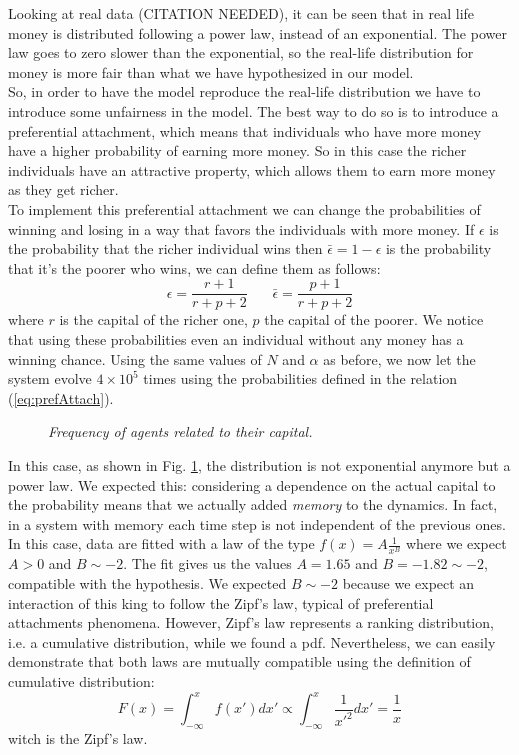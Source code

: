 Looking at real data (CITATION NEEDED), it can be seen that in real life money is distributed following a power law, instead of an exponential.
The power law goes to zero slower than the exponential, so the real-life distribution for money is more fair than what we have hypothesized in our model. \\
So, in order to have the model reproduce the real-life distribution we have to introduce some unfairness in the model.
The best way to do so is to introduce a preferential attachment, which means that individuals who have more money have a higher probability of earning more money.
So in this case the richer individuals have an attractive property, which allows them to earn more money as they get richer. \\
To implement this preferential attachment we can change the probabilities of winning and losing in a way that favors the individuals with more money.
If $\epsilon$ is the probability that the richer individual wins then $\bar{\epsilon} = 1 - \epsilon$ is the probability that it's the poorer who wins, we can define them as follows:
\begin{equation}
	\epsilon = \frac{r + 1}{r + p + 2} \ \ \ \ \ \ \ \  \bar{\epsilon} = \frac{p + 1}{r + p + 2}
	\label{eq:prefAttach}
\end{equation}
where $r$ is the capital of the richer one, $p$ the capital of the poorer.
We notice that using these probabilities even an individual without any money has a winning chance.
Using the same values of $N$ and $\alpha$ as before, we now let the system evolve $4 \times 10^5$ times using the probabilities defined in the relation (\ref*{eq:prefAttach}).
\begin{figure}[ht!]
    \centering
    \scalebox{.7}{}
    \caption{\emph{Frequency of agents related to their capital.}}
    \label{fig:prefAttach}
\end{figure}
In this case, as shown in Fig. \ref{fig:prefAttach}, the distribution is not exponential anymore but a power law.
We expected this: considering a dependence on the actual capital to the probability means that we actually added \emph{memory} to the dynamics.
In fact, in a system with memory each time step is not independent of the previous ones.
In this case, data are fitted with a law of the type $f(x) = A\frac{1}{x^B}$ where we expect $A > 0$ and $B \sim -2$.
The fit gives us the values $A = 1.65$ and $B = -1.82 \sim -2$, compatible with the hypothesis.
We expected $B \sim -2$ because we expect an interaction of this king to follow the Zipf's law, typical of preferential attachments phenomena.
However, Zipf's law represents a ranking distribution, i.e. a cumulative distribution, while we found a pdf.
Nevertheless, we can easily demonstrate that both laws are mutually compatible using the definition of cumulative distribution:
\begin{equation*}
	F(x) = \int_{-\infty}^x f(x') dx' \propto \int_{-\infty}^x \frac{1}{{x'}^2} dx' = \frac{1}{x}
\end{equation*}
witch is the Zipf's law.